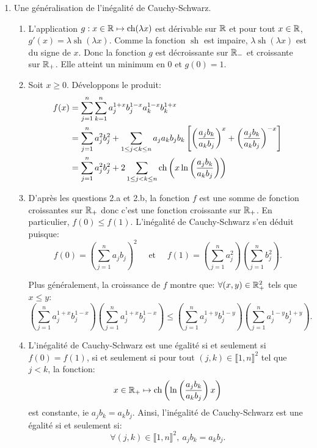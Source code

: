 \begin{enumerate}
  \item Une généralisation de l'inégalité de Cauchy-Schwarz.
    \begin{enumerate}
     \item L'application $g:x\in \mathbb{R} \mapsto \operatorname{ch}(\lambda x)$ est dérivable sur $\mathbb{R}$ et pour tout $x\in \mathbb{R}$, $g'(x) = \lambda \operatorname{sh}(\lambda x)$. Comme la fonction $\operatorname{sh}$ est impaire,
     $\lambda \operatorname{sh}(\lambda x)$ est du signe de $x$. Donc la fonction $g$ est décroissante sur $\mathbb{R}_{-}$ et croissante sur $\mathbb{R}_{+}$. Elle atteint un minimum en $0$ et $g(0) = 1$.
     \item Soit $x\geq 0$. Développons le produit:
     \begin{align}
      f(x) & = \sum_{j=1}^{n}\sum_{k=1}^{n}a_{j}^{1+x}b_{j}^{1-x}a_{k}^{1-x}b_{k}^{1+x}\notag \\
      & = \sum_{j=1}^{n}a_{j}^{2}b_{j}^{2} + \sum_{1\leq j < k \leq n}a_{j}a_{k}b_{j}b_{k} \left [ \left ( \frac{a_{j}b_{k}}{a_{k}b_{j}}\right )^{x} + \left (\frac{a_{j}b_{k}}{a_{k}b_{j}}\right )^{-x} \right ]\notag\\
      & = \sum_{j=1}^{n}a_{j}^{2}b_{j}^{2} + 2\sum_{1\leq j < k \leq n}\operatorname{ch}\left ( x\ln \left ( \frac{a_{j}b_{k}}{a_{k}b_{j}}\right )  \right )\notag
     \end{align}
     
     \item D'après les questions 2.a et 2.b, la fonction $f$ est une somme de fonction croissantes sur $\mathbb{R}_{+}$ donc c'est une fonction croissante sur $\mathbb{R}_{+}$. En particulier, $f(0) \leq f(1)$. L'inégalité de Cauchy-Schwarz 
     s'en déduit puisque:
     \[ f(0) = \left ( \sum_{j=1}^{n}a_{j}b_{j}\right )^{2} \quad \text{ et } \quad f(1) = \left ( \sum_{j=1}^{n}a_{j}^{2}\right ) \left ( \sum_{j=1}^{n}b_{j}^{2}\right ). \]
     
     Plus généralement, la croissance de $f$ montre que: $\forall (x,y)\in \mathbb{R}_{+}^{2}$ tels que $x\leq y$:
     \[\left ( \sum_{j=1}^{n}a_{j}^{1+x}b_{j}^{1-x}\right ) \left ( \sum_{j=1}^{n}a_{j}^{1+x}b_{j}^{1-x}\right ) 
     \leq 
     \left ( \sum_{j=1}^{n}a_{j}^{1+y}b_{j}^{1-y}\right ) \left ( \sum_{j=1}^{n}a_{j}^{1-y}b_{j}^{1+y}\right ).\]
     
     \item L'inégalité de Cauchy-Schwarz est une égalité si et seulement si $f(0) = f(1)$, si et seulement si pour tout $(j, k)\in \llbracket 1, n\rrbracket^{2}$ tel que $j < k$, la fonction:
     \[ x \in  \mathbb{R}_{+} \mapsto \operatorname{ch}\left ( \ln \left ( \frac{a_{j}b_{k}}{a_{k}b_{j}}\right ) x\right ) \]
     est constante, ie $a_{j}b_{k} = a_{k}b_{j}$. Ainsi, l'inégalité de Cauchy-Schwarz est une égalité si et seulement si:
     \[ \forall (j, k)\in \llbracket 1, n\rrbracket^{2},\ a_{j}b_{k} = a_{k}b_{j}.\]
    \end{enumerate}
\end{enumerate}